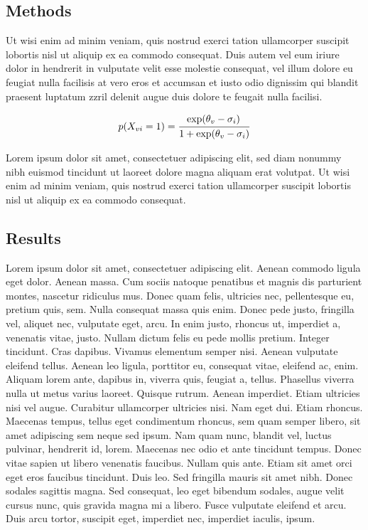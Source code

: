 \documentclass[a1paper, english]{article}
\begin{document}
\vfill

\begin{posterbox}
	\section*{Methods}
	Ut wisi enim ad minim veniam, quis nostrud exerci tation ullamcorper suscipit lobortis nisl ut aliquip ex ea commodo consequat. Duis autem vel eum iriure dolor in hendrerit in vulputate velit esse molestie consequat, vel illum dolore eu feugiat nulla facilisis at vero eros et accumsan et iusto odio dignissim qui blandit praesent luptatum zzril delenit augue duis dolore te feugait nulla facilisi.

	\begin{equation}
		p\!\left(X_{vi} = 1\right)
		= \frac{\exp\!\left(\theta_v - \sigma_i\right)\strut}
		{\strut 1 + \exp\!\left(\theta_v - \sigma_i\right)}
	\end{equation}

	Lorem ipsum dolor sit amet, consectetuer adipiscing elit, sed diam nonummy nibh euismod tincidunt ut laoreet dolore magna aliquam erat volutpat. Ut wisi enim ad minim veniam, quis nostrud exerci tation ullamcorper suscipit lobortis nisl ut aliquip ex ea commodo consequat.
\end{posterbox}

\vfill

\begin{posterbox}
	\section*{Results}
	Lorem ipsum dolor sit amet, consectetuer adipiscing elit. Aenean commodo ligula eget dolor. Aenean massa. Cum sociis natoque penatibus et magnis dis parturient montes, nascetur ridiculus mus. Donec quam felis, ultricies nec, pellentesque eu, pretium quis, sem. Nulla consequat massa quis enim. Donec pede justo, fringilla vel, aliquet nec, vulputate eget, arcu. In enim justo, rhoncus ut, imperdiet a, venenatis vitae, justo. Nullam dictum felis eu pede mollis pretium. Integer tincidunt. Cras dapibus. Vivamus elementum semper nisi. Aenean vulputate eleifend tellus. Aenean leo ligula, porttitor eu, consequat vitae, eleifend ac, enim. Aliquam lorem ante, dapibus in, viverra quis, feugiat a, tellus. Phasellus viverra nulla ut metus varius laoreet. Quisque rutrum. Aenean imperdiet. Etiam ultricies nisi vel augue. Curabitur ullamcorper ultricies nisi. Nam eget dui. Etiam rhoncus. Maecenas tempus, tellus eget condimentum rhoncus, sem quam semper libero, sit amet adipiscing sem neque sed ipsum. Nam quam nunc, blandit vel, luctus pulvinar, hendrerit id, lorem. Maecenas nec odio et ante tincidunt tempus. Donec vitae sapien ut libero venenatis faucibus. Nullam quis ante. Etiam sit amet orci eget eros faucibus tincidunt. Duis leo. Sed fringilla mauris sit amet nibh. Donec sodales sagittis magna. Sed consequat, leo eget bibendum sodales, augue velit cursus nunc, quis gravida magna mi a libero. Fusce vulputate eleifend et arcu. Duis arcu tortor, suscipit eget, imperdiet nec, imperdiet iaculis, ipsum.
\end{posterbox}
\end{document}
